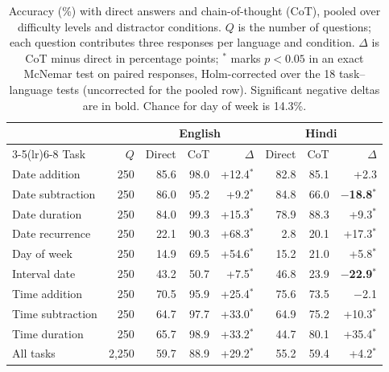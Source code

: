 \begin{table}[t]
\centering
\begin{tabular}{lrrrrrrr}
\toprule
 & & \multicolumn{3}{c}{English} & \multicolumn{3}{c}{Hindi} \\
\cmidrule(lr){3-5}\cmidrule(lr){6-8}
Task & $Q$ & Direct & CoT & $\Delta$ & Direct & CoT & $\Delta$ \\
\midrule
Date addition & 250 & 85.6 & 98.0 & +12.4$^{*}$ & 82.8 & 85.1 & +2.3\phantom{$^{*}$} \\
Date subtraction & 250 & 86.0 & 95.2 & +9.2$^{*}$ & 84.8 & 66.0 & \textbf{$-$18.8$^{*}$} \\
Date duration & 250 & 84.0 & 99.3 & +15.3$^{*}$ & 78.9 & 88.3 & +9.3$^{*}$ \\
Date recurrence & 250 & 22.1 & 90.3 & +68.3$^{*}$ & 2.8 & 20.1 & +17.3$^{*}$ \\
Day of week & 250 & 14.9 & 69.5 & +54.6$^{*}$ & 15.2 & 21.0 & +5.8$^{*}$ \\
Interval date & 250 & 43.2 & 50.7 & +7.5$^{*}$ & 46.8 & 23.9 & \textbf{$-$22.9$^{*}$} \\
Time addition & 250 & 70.5 & 95.9 & +25.4$^{*}$ & 75.6 & 73.5 & $-$2.1\phantom{$^{*}$} \\
Time subtraction & 250 & 64.7 & 97.7 & +33.0$^{*}$ & 64.9 & 75.2 & +10.3$^{*}$ \\
Time duration & 250 & 65.7 & 98.9 & +33.2$^{*}$ & 44.7 & 80.1 & +35.4$^{*}$ \\
\midrule
All tasks & 2,250 & 59.7 & 88.9 & +29.2$^{*}$ & 55.2 & 59.4 & +4.2$^{*}$ \\
\bottomrule
\end{tabular}
\caption{Accuracy (\%) with direct answers and chain-of-thought (CoT), pooled over difficulty levels and distractor conditions. $Q$ is the number of questions; each question contributes three responses per language and condition. $\Delta$ is CoT minus direct in percentage points; $^{*}$ marks $p<0.05$ in an exact McNemar test on paired responses, Holm-corrected over the 18 task--language tests (uncorrected for the pooled row). Significant negative deltas are in bold. Chance for day of week is 14.3\%.}
\label{tab:cot-delta}
\end{table}

